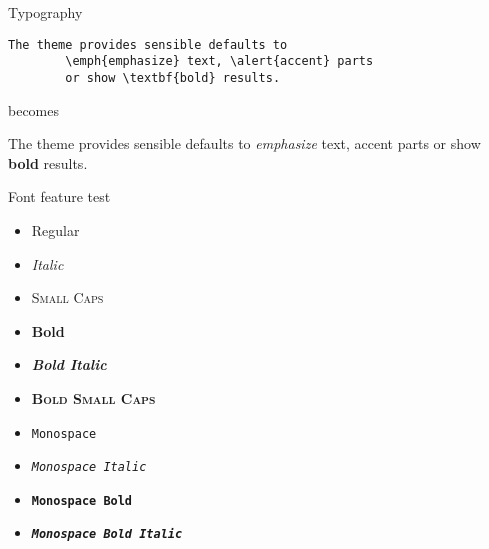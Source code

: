 \begin{frame}[fragile]{Typography}
	\begin{verbatim}The theme provides sensible defaults to
		\emph{emphasize} text, \alert{accent} parts
		or show \textbf{bold} results.\end{verbatim}
	
	\begin{center}becomes\end{center}
	
	The theme provides sensible defaults to \emph{emphasize} text,
	\alert{accent} parts or show \textbf{bold} results.
\end{frame}

\begin{frame}{Font feature test}
	\begin{itemize}
		\item Regular
		\item \textit{Italic}
		\item \textsc{Small Caps}
		\item \textbf{Bold}
		\item \textbf{\textit{Bold Italic}}
		\item \textbf{\textsc{Bold Small Caps}}
		\item \texttt{Monospace}
		\item \texttt{\textit{Monospace Italic}}
		\item \texttt{\textbf{Monospace Bold}}
		\item \texttt{\textbf{\textit{Monospace Bold Italic}}}
	\end{itemize}
\end{frame}

